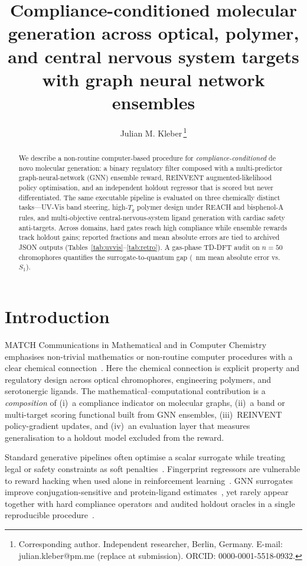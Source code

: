\documentclass[12pt]{article}
\title{Compliance-conditioned molecular generation across optical, polymer, and central nervous system targets with graph neural network ensembles}
\author{Julian M. Kleber\,\orcidlink{0000-0001-5518-0932}\thanks{Corresponding author. Independent researcher, Berlin, Germany. E-mail: julian.kleber@pm.me (replace at submission). ORCID: 0000-0001-5518-0932.}}
\date{}
\begin{document}
\maketitle
{}

\begin{abstract}
We describe a non-routine computer-based procedure for \emph{compliance-conditioned} de novo
molecular generation: a binary regulatory filter composed with a multi-predictor graph-neural-network
(GNN) ensemble reward, REINVENT augmented-likelihood policy optimisation, and an independent
holdout regressor that is scored but never differentiated. The same executable pipeline is
evaluated on three chemically distinct tasks---UV-Vis band steering, high-$T_g$ polymer design
under REACH and bisphenol-A rules, and multi-objective central-nervous-system ligand generation
with cardiac safety anti-targets. Across domains, hard gates reach high compliance while ensemble
rewards track holdout gains; reported fractions and mean absolute errors are tied to archived JSON
outputs (Tables~\ref{tab:uvvis}--\ref{tab:retro}). A gas-phase TD-DFT audit on $n=50$ chromophores
quantifies the surrogate-to-quantum gap (\MacroDftMaeGnn{}~nm mean absolute error vs.\ $S_1$).
\end{abstract}


\section{Introduction}

MATCH Communications in Mathematical and in Computer Chemistry emphasises non-trivial mathematics
or non-routine computer procedures with a clear chemical connection~\cite{matchjournalscope}.
Here the chemical connection is explicit property and regulatory design across optical chromophores,
engineering polymers, and serotonergic ligands. The mathematical--computational contribution is a
\emph{composition} of (i)~a compliance indicator on molecular graphs, (ii)~a band or multi-target
scoring functional built from GNN ensembles, (iii)~REINVENT policy-gradient updates, and
(iv)~an evaluation layer that measures generalisation to a holdout model excluded from the reward.

Standard generative pipelines often optimise a scalar surrogate while treating legal or safety
constraints as soft penalties~\cite{gomez2018automatic,olivecrona2017molgan}. Fingerprint regressors
are vulnerable to reward hacking when used alone in reinforcement learning~\cite{blaschke2020reinvent}.
GNN surrogates improve conjugation-sensitive and protein-ligand estimates~\cite{wang2017chemprop,xu2019molecular},
yet rarely appear together with hard compliance operators and audited holdout oracles in a single
reproducible procedure~\cite{grisoni2021combining}.
\end{document}
